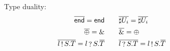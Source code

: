\begin{figure}[h!]
  Type duality:
    \begin{align*}
      \overline{\mathsf{end}} = \mathsf{end} &\qquad \overline{\sharp{U_i}} = \overline{\sharp{}} \overline{U_i} \\
      \overline{\oplus{}} = \&{} &\qquad \overline{\&{}} = \oplus{} \\
      \overline{l \mathop!S . T} = l \mathop?S . \overline{T} &\qquad \overline{l \mathop?S . T} = l \mathop!S . \overline{T}
    \end{align*}
\end{figure}
 

